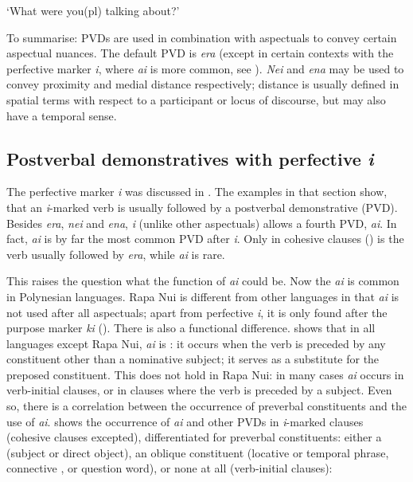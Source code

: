 \glt 
‘What were you(pl) talking about?’ \textstyleExampleref{[Ley-2-02.062]}
\z

To summarise: PVDs are used in combination with aspectuals to convey certain aspectual nuances. The default PVD is \textit{era} (except in certain contexts with the perfective marker \textit{i}, where \textit{ai} is more common, see ). \textit{Nei} and \textit{ena} may be used to convey proximity and medial distance respectively; distance is usually defined in spatial terms with respect to a participant or locus of discourse, but may also have a temporal sense.
\subsection{Postverbal demonstratives with perfective \textit{i}}\label{sec:7.6.5}

The perfective marker \textit{i} was discussed in . The examples in that section show, that an \textit{i}{}-marked verb is usually followed by a postverbal demonstrative (PVD). Besides \textit{era}, \textit{nei} and \textit{ena}, \textit{i} (unlike other aspectuals) allows a fourth PVD, \textit{ai}. In fact, \textit{ai} is by far the most common PVD after \textit{i}. Only in cohesive clauses () is the verb usually followed by \textit{era}, while \textit{ai} is rare.

This raises the question what the function of \textit{ai} could be. Now the  \textit{ai} is common in Polynesian languages. Rapa Nui is different from other languages in that \textit{ai} is not used after all aspectuals; apart from perfective \textit{i}, it is only found after the purpose marker \textit{ki} (). There is also a functional difference. \citet{Chapin1974} shows that in all languages except Rapa Nui, \textit{ai} is : it occurs when the verb is preceded by any constituent other than a nominative subject; it serves as a substitute for the preposed constituent. This does not hold in Rapa Nui: in many cases \textit{ai} occurs in verb-initial clauses, or in clauses where the verb is preceded by a subject. Even so, there is a correlation between the occurrence of preverbal constituents and the use of \textit{ai}.  shows the occurrence of \textit{ai} and other PVDs in \textit{i}{}-marked clauses (cohesive clauses excepted), differentiated for preverbal constituents: either a  (subject or direct object), an oblique constituent (locative or temporal phrase, connective , or question word), or none at all (verb-initial clauses): 

